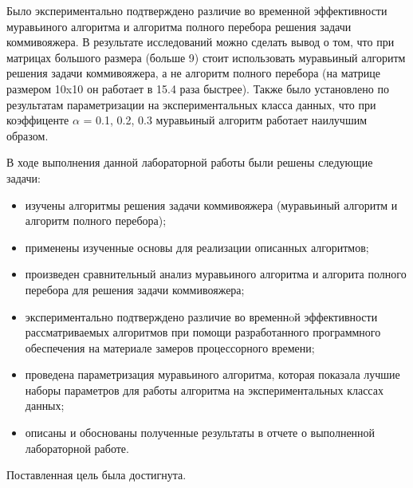 \Conclusion %


Было экспериментально подтверждено различие во временной эффективности муравьиного алгоритма и алгоритма полного перебора решения задачи коммивояжера. В результате исследований можно сделать вывод о том, что при матрицах большого размера (больше 9) стоит использовать муравьиный алгоритм решения задачи коммивояжера, а не алгоритм полного перебора (на матрице размером 10x10 он работает в 15.4 раза быстрее). Также было установлено по результатам параметризации на экспериментальных класса данных, что при коэффиценте $\alpha$ = 0.1, 0.2, 0.3 муравьиный алгоритм работает наилучшим образом.
\vspace{5mm}

В ходе выполнения данной лабораторной работы были решены следующие задачи:
\begin{itemize}
	\item изучены алгоритмы решения задачи коммивояжера (муравьиный алгоритм и алгоритм полного перебора);
	\item применены изученные основы для реализации описанных алгоритмов;
	\item произведен сравнительный анализ муравьиного алгоритма и алгорита полного перебора для решения задачи коммивояжера;
	\item экспериментально подтверждено различие во временнoй эффективности рассматриваемых алгоритмов при помощи разработанного программного обеспечения на материале замеров процессорного времени;
	\item проведена параметризация муравьиного алгоритма, которая показала лучшие наборы параметров для работы алгоритма на экспериментальных классах данных;
	\item описаны и обоснованы полученные результаты в отчете о выполненной лабораторной работе.
\end{itemize}

Поставленная цель была достигнута.



